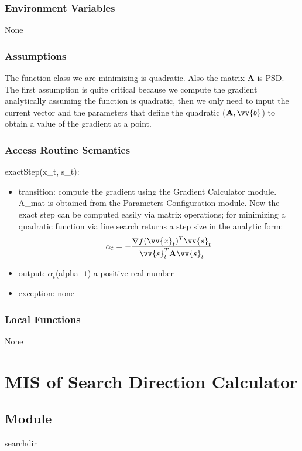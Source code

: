 \documentclass[12pt, titlepage]{article}
\begin{document}
\subsubsection{Environment Variables}

None

\subsubsection{Assumptions}

The function class we are minimizing is quadratic. Also the matrix $\mathbf{A}$ is PSD. The first assumption is quite critical because we compute the gradient analytically assuming the function is quadratic, then we only need to input the current vector and the parameters that define the quadratic ($\mathbf{A}, \vv{b}$) to obtain a value of the gradient at a point. 

\subsubsection{Access Routine Semantics}

\noindent exactStep(x\_t, s\_t):
\begin{itemize}
\item transition: compute the gradient using the Gradient Calculator module. A\_mat is obtained from the Parameters Configuration module. Now the exact step can be computed easily via matrix operations; for minimizing a quadratic function via line search returns a step size in the analytic form:
\begin{align*}
    \alpha_t = -\frac{\nabla f(\vv{x}_t)^{T}\vv{s}_{t}}{\vv{s}^{T}_{t}\mathbf{A}\vv{s}_t}
\end{align*}
\item output: $\alpha_t$(alpha\_t) a positive real number 
\item exception: none
\end{itemize}

\subsubsection{Local Functions}
None

\section{MIS of Search Direction Calculator} \label{Module:SearchDir}

\subsection{Module}
searchdir
\end{document}
